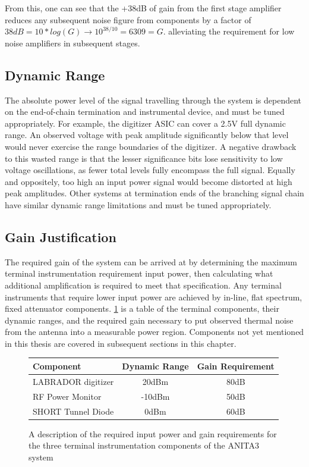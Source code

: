	From this, one can see that the +38dB of gain from the first stage amplifier reduces any subsequent noise figure from components by a factor of $38dB = 10*log(G) \rightarrow 10^{38/10} =  6309 = G$. alleviating the requirement for low noise amplifiers in subsequent stages.


	\subsection{Dynamic Range}
		The absolute power level of the signal travelling through the system is dependent on the end-of-chain termination and instrumental device, and must be tuned appropriately.  For example, the digitizer ASIC can cover a 2.5V full dynamic range.  An observed voltage with peak amplitude significantly below that level would never exercise the range boundaries of the digitizer.  A negative drawback to this wasted range is that the lesser significance bits lose sensitivity to low voltage oscillations, as fewer total levels fully encompass the full signal.  Equally and oppositely, too high an input power signal would become distorted at high peak amplitudes. Other systems at termination ends of the branching signal chain have similar dynamic range limitations and must be tuned appropriately.
		
		
	\subsection{Gain Justification}
		The required gain of the system can be arrived at by determining the maximum terminal instrumentation requirement input power, then calculating what additional amplification is required to meet that specification.  Any terminal instruments that require lower input power are achieved by in-line, flat spectrum, fixed attenuator components.  \ref{tab:rfLinkBudget} is a table of the terminal components, their dynamic ranges, and the required gain necessary to put observed thermal noise from the antenna into a measurable power region.  Components not yet mentioned in this thesis are covered in subsequent sections in this chapter.
	
\begin{figure}
	\centering
	\label{tab:rfLinkBudget}
	\begin{tabular}{| l | c | c |}
		\hline
		Component & Dynamic Range & Gain Requirement\\
		\hline
		LABRADOR digitizer & 20dBm & 80dB \\
		RF Power Monitor & -10dBm & 50dB \\
		SHORT Tunnel Diode & 0dBm & 60dB \\
		\hline
	\end{tabular}
	\caption{A description of the required input power and gain requirements for the three terminal instrumentation components of the ANITA3 system}
\end{figure}
	
